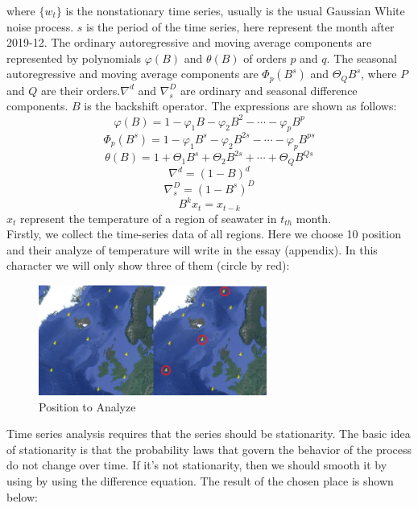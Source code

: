 \documentclass{mcmthesis}
\begin{document}
where $\{w_{t}\}$ is the nonstationary time series, usually is the usual Gaussian White noise process. $s$ is the period of the time series, here represent the month after 2019-12. The ordinary autoregressive and moving average components are represented by polynomials $\varphi(B)$ and $\theta(B)$ of orders $p$ and $q$. The seasonal autoregressive and moving average components are $\Phi_{p}(B^s)$ and $\Theta_{Q}B^{s}$, where $P$ and $Q$ are their orders.$\nabla^{d}$ and $\nabla_{s}^{D}$  are ordinary and seasonal difference components. $B$ is the backshift operator. The expressions are shown as follows:
\begin{equation} \varphi(B)=1-\varphi_{1}B - \varphi_{2}B^2 - \cdots- \varphi_{p}B^p \end{equation} 
\begin{equation} \Phi_{p}(B^s)=1-\varphi_{1}B^s - \varphi_{2}B^{2s} - \cdots- \varphi_{p}B^{ps}\end{equation}
\begin{equation} \theta(B)=1+\Theta_{1}B^s + \Theta_{2}B^{2s}+\cdots+\Theta_{Q}B^{Qs}\end{equation}
\begin{equation} \nabla^d = (1-B)^d \end{equation}
\begin{equation} \nabla_{s}^D=(1-B^s)^D\end{equation}
\begin{equation} B^k x_{t}=x_{t-k}\end{equation}
 $x_{t}$ represent the temperature of a region of seawater in $t_{th}$ month.\\
Firstly, we collect the time-series data of all regions. Here we choose 10 position and their analyze of temperature will write in the essay (appendix). In this character we will only show three of them (circle by red):
\textbf{}
\begin{figure}[h]
\centering
\includegraphics[width=7.5cm]{./figures/circle.png}
\caption{Position to Analyze}
\end{figure}
Time series analysis requires that the series should be stationarity. The basic idea of stationarity is that the probability laws that govern the behavior of the process do not change over time. If it’s not stationarity, then we should smooth it by using by using the difference equation. The result of  the chosen place is shown below:
\end{document}
